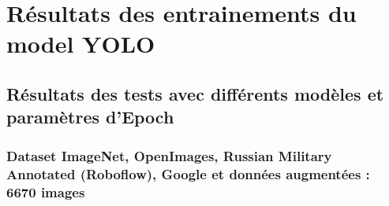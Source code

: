 
\chapter{Résultats des entrainements du model YOLO}

\section*{Résultats des tests avec différents modèles et paramètres d'Epoch}

\subsection*{Dataset ImageNet, OpenImages, Russian Military Annotated (Roboflow), Google et données augmentées : 6670 images}

